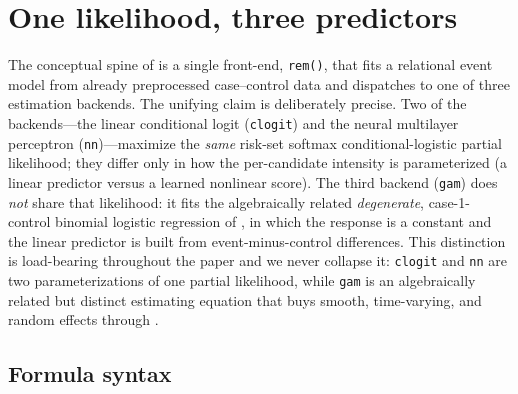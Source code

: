 \section{One likelihood, three predictors}
\label{sec:framework}

The conceptual spine of  is a single front-end, \texttt{rem()},
that fits a relational event model from already preprocessed case--control
data and dispatches to one of three estimation backends. The unifying claim
is deliberately precise. Two of the backends---the linear conditional logit
(\texttt{clogit}) and the neural multilayer perceptron (\texttt{nn})---maximize
the \emph{same} risk-set softmax conditional-logistic partial likelihood; they
differ only in how the per-candidate intensity is parameterized (a linear
predictor versus a learned nonlinear score). The third backend (\texttt{gam})
does \emph{not} share that likelihood: it fits the algebraically related
\emph{degenerate}, case-1-control binomial logistic regression of
\citet{boschi2025rhem}, in which the response is a constant and the linear
predictor is built from event-minus-control differences. This distinction is
load-bearing throughout the paper and we never collapse it: \texttt{clogit} and
\texttt{nn} are two parameterizations of one partial likelihood, while
\texttt{gam} is an algebraically related but distinct estimating equation that
buys smooth, time-varying, and random effects through .

\subsection{Formula syntax}
\label{sec:framework-formula}

